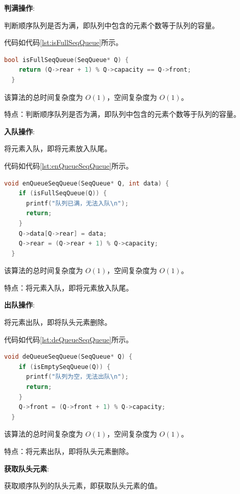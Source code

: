 \documentclass[lang=cn,newtx,10pt,scheme=chinese]{../elegantbook}
\begin{document}
\textbf{判满操作}:

判断顺序队列是否为满，即队列中包含的元素个数等于队列的容量。

代码如代码\ref{lst:isFullSeqQueue}所示。

\begin{lstlisting}[language=C++, caption={判断顺序队列是否为满示例代码}, label={lst:isFullSeqQueue}]
  bool isFullSeqQueue(SeqQueue* Q) {
    return (Q->rear + 1) % Q->capacity == Q->front;
  }

\end{lstlisting}

该算法的总时间复杂度为 $O(1)$，空间复杂度为 $O(1)$。

特点：判断顺序队列是否为满，即队列中包含的元素个数等于队列的容量。

\textbf{入队操作}:

将元素入队，即将元素放入队尾。

代码如代码\ref{lst:enQueueSeqQueue}所示。

\begin{lstlisting}[language=C++, caption={入队示例代码}, label={lst:enQueueSeqQueue}]
  void enQueueSeqQueue(SeqQueue* Q, int data) {
    if (isFullSeqQueue(Q)) {
      printf("队列已满，无法入队\n");
      return;
    }
    Q->data[Q->rear] = data;
    Q->rear = (Q->rear + 1) % Q->capacity;
  }

\end{lstlisting}

该算法的总时间复杂度为 $O(1)$，空间复杂度为 $O(1)$。

特点：将元素入队，即将元素放入队尾。

\textbf{出队操作}:

将元素出队，即将队头元素删除。

代码如代码\ref{lst:deQueueSeqQueue}所示。

\begin{lstlisting}[language=C++, caption={出队示例代码}, label={lst:deQueueSeqQueue}]
  void deQueueSeqQueue(SeqQueue* Q) {
    if (isEmptySeqQueue(Q)) {
      printf("队列为空，无法出队\n");
      return;
    }
    Q->front = (Q->front + 1) % Q->capacity;
  }

\end{lstlisting}

该算法的总时间复杂度为 $O(1)$，空间复杂度为 $O(1)$。

特点：将元素出队，即将队头元素删除。

\textbf{获取队头元素}:

获取顺序队列的队头元素，即获取队头元素的值。
\end{document}
